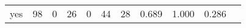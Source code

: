 \begin{longtable}{lp{1.10cm}p{1.10cm}p{1.10cm}p{1.10cm}p{1.10cm}p{1.10cm}p{1.10cm}p{1.10cm}p{1.10cm}p{1.10cm}}
yes       &                     98 &                                  0 &                                26 &                                0 &                                44 &                              28 &                          0.689 &                                 1.000 &                               0.286 \\
\end{longtable}
